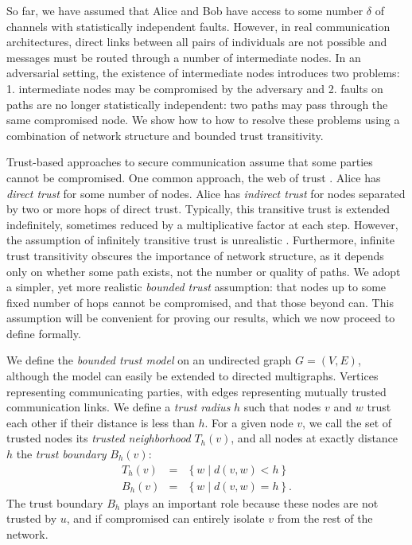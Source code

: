 \documentclass[10pt,letterpaper]{article}
\newcommand{\beq}{\begin{eqnarray}}
\newcommand{\eeq}{\end{eqnarray}}
\begin{document}
So far, we have assumed that Alice and Bob have access to some number
$\delta$ of channels with statistically independent faults.
However, in real communication architectures, direct links between all
pairs of individuals are not possible and messages must be routed through
a number of intermediate nodes.
In an adversarial setting,
the existence of intermediate nodes introduces two problems:
1. intermediate nodes may be compromised by the adversary and
2. faults on paths are no longer statistically independent:
two paths may pass through the same compromised node.
We show how to how to resolve these problems using a combination of network
structure and bounded trust transitivity.

Trust-based approaches to secure communication assume that some parties
cannot be compromised.
One common approach, the web of trust
\cite{zimmermann_official_1995,richters_trust_2011}.
Alice has {\em direct trust} for some number of nodes.
Alice has {\em indirect trust} for nodes separated by two or more hops of
direct trust.
Typically, this transitive trust is extended indefinitely,
sometimes reduced by a multiplicative factor at each step.
However, the assumption of infinitely transitive trust is unrealistic
\cite{christianson_why_1997}.
Furthermore, infinite trust transitivity obscures the importance of network structure,
as it depends only on whether some path exists, not the number or quality of paths.
We adopt a simpler, yet more realistic {\em bounded trust} assumption:
that nodes up to some fixed number of hops cannot be compromised,
and that those beyond can.
This assumption will be convenient for proving our results,
which we now proceed to define formally.

We define the {\em bounded trust model} on
an undirected graph $G = (V,E)$,
although the model can easily be extended to directed multigraphs.
Vertices representing communicating parties,
with edges representing mutually trusted communication links.
We define a {\em trust radius} $h$ such that nodes $v$ and
$w$ trust each other if their distance is less than $h$.
For a given node $v$,
we call the set of trusted nodes its
{\em trusted neighborhood} $T_h(v)$,
and all nodes at exactly distance $h$ the
{\em trust boundary} $B_h(v)$:
\beq
T_h(v) &=& \left\{ w \mid d(v,w) < h \right\} \\
B_h(v) &=& \left\{ w \mid d(v,w) = h \right\}.
\eeq
The trust boundary $B_h$ plays an important role because these nodes are not
trusted by $u$,
and if compromised can entirely isolate $v$ from the rest of the network.
\end{document}
